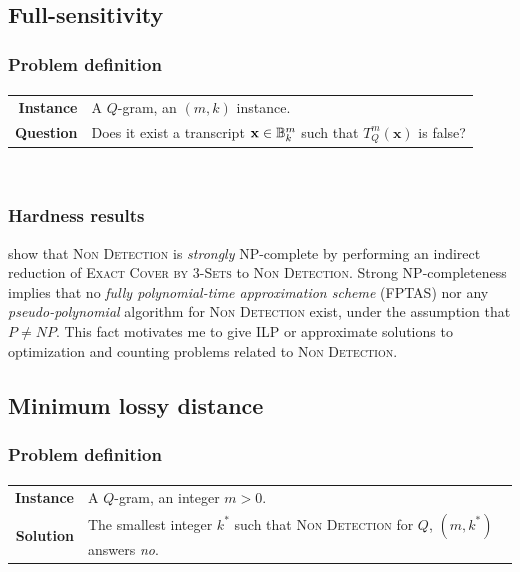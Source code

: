\subsection{Full-sensitivity}
\label{sub:qgram-full-sensitivity}


\subsubsection{Problem definition}

\paragraph{}
\begin{tabular}{rl}
{\bf Instance}	&	A $Q$-gram, an $(m,k)$ instance. \\
{\bf Question}	&	Does it exist a transcript $\mathbf{x} \in \mathbb {B}^{m}_{k}$ such that $T_{Q}^{m}(\mathbf{x})$ is false? \\
\end{tabular}
\\

\subsubsection{Hardness results}

\cite{Nicolas2005} show that \textsc{Non Detection} is \emph{strongly} NP-complete by performing an indirect reduction of \textsc{Exact Cover by 3-Sets} to \textsc{Non Detection}.
Strong NP-completeness implies that no \emph{fully polynomial-time approximation scheme} (FPTAS) nor any \emph{pseudo-polynomial} algorithm for \textsc{Non Detection} exist, under the assumption that $P \neq NP$.
This fact motivates me to give ILP or approximate solutions to optimization and counting problems related to \textsc{Non Detection}.

\subsection{Minimum lossy distance}
\label{sub:qgram-min-lossy-distance}

\subsubsection{Problem definition}

\paragraph{}
\begin{tabular}{rl}
{\bf Instance}	&	A $Q$-gram, an integer $m > 0$.\\
{\bf Solution}	&	The smallest integer $k^*$ such that \textsc{Non Detection} for $Q$, $(m,k^*)$ answers \emph{no}.\\
\end{tabular}
\\

